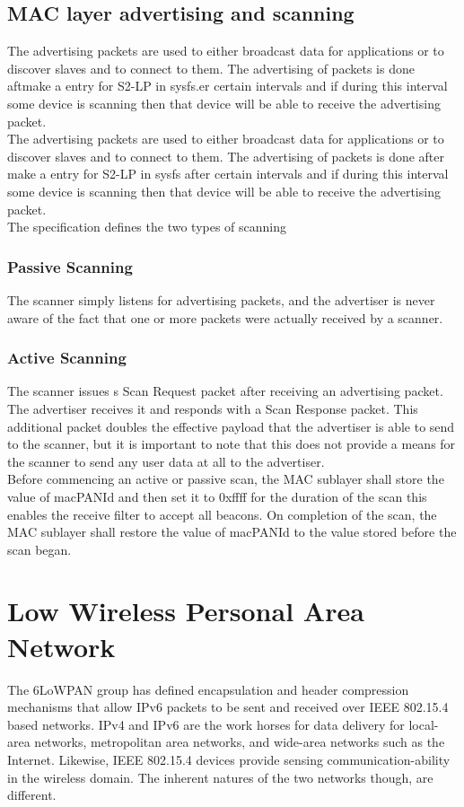 \subsection{MAC layer advertising and scanning}
The advertising packets are used to either broadcast data for applications or to discover slaves and to connect to them. The advertising of packets is done aftmake a entry for S2-LP in sysfs.er certain intervals and if during this interval some device is scanning then that device will be able to receive the advertising packet.\\
The advertising packets are used to either broadcast data for applications or to discover slaves and to connect to them. The advertising of packets is done after make a entry for S2-LP in sysfs after certain intervals and if during this interval some device is scanning then that device will be able to receive the advertising packet.\\
The specification defines the two types of scanning\\
\subsubsection{Passive Scanning}
The scanner simply listens for advertising packets, and the advertiser is never aware of the fact that one or more packets were actually received by a scanner.
\subsubsection{Active Scanning}
The scanner issues s Scan Request packet after receiving an advertising packet. The advertiser receives it and responds with a Scan Response packet. This additional packet doubles the effective payload that the advertiser is able to send to the scanner, but it is important to note that this does not provide a means for the scanner to send any user data at all to the advertiser.\\
Before commencing an active or passive scan, the MAC sublayer shall store the value of macPANId and then set it to 0xffff for the duration of the scan this enables the receive filter to accept all beacons. On completion of the scan, the MAC sublayer shall restore the value of macPANId to the value stored before the scan began.
\section{Low Wireless Personal Area Network}
The 6LoWPAN group has defined encapsulation and header compression mechanisms that allow IPv6 packets to be sent and received over IEEE 802.15.4 based networks. IPv4 and IPv6 are the work horses for data delivery for local-area networks, metropolitan area networks, and wide-area networks such as the Internet. Likewise, IEEE 802.15.4 devices provide sensing communication-ability in the wireless domain. The inherent natures of the two networks though, are different.
